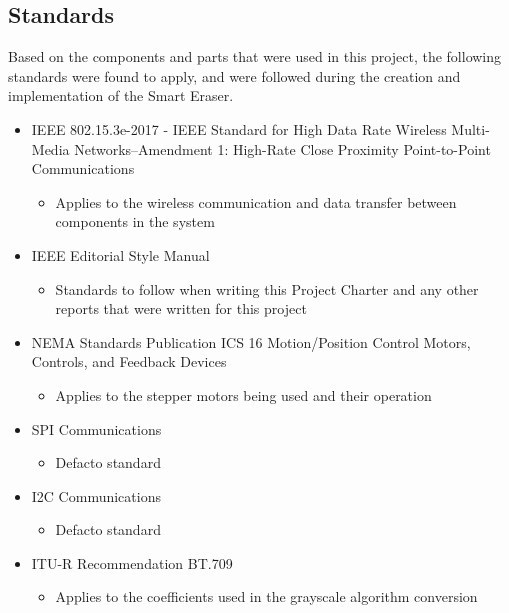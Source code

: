 \subsection{Standards}
\setlength{\parindent}{2.5ex} Based on the components and parts that were used in this project, the following standards were found to apply, and were followed during the creation and implementation of the Smart Eraser.
\begin{itemize}
	\item IEEE 802.15.3e-2017 - IEEE Standard for High Data Rate Wireless Multi-Media Networks--Amendment 1: High-Rate Close Proximity Point-to-Point Communications
	\begin{itemize}
		\item Applies to the wireless communication and data transfer between components in the system \cite{wifiStandards}
	\end{itemize}
	\item IEEE Editorial Style Manual
	\begin{itemize}
		\item Standards to follow when writing this Project Charter and any other reports that were written for this project \cite{ieee}
	\end{itemize}
	\item NEMA Standards Publication ICS 16 Motion/Position Control Motors, Controls, and Feedback Devices
	\begin{itemize}
		\item Applies to the stepper motors being used and their operation \cite{nema1}
	\end{itemize}
	\item SPI Communications
	\begin{itemize}
		\item Defacto standard
	\end{itemize}
	\item I2C Communications
	\begin{itemize}
		\item Defacto standard
	\end{itemize}
	\item ITU-R Recommendation BT.709
	\begin{itemize}
		\item Applies to the coefficients used in the grayscale algorithm conversion \cite{rec709}
	\end{itemize}
	
\end{itemize}
 
